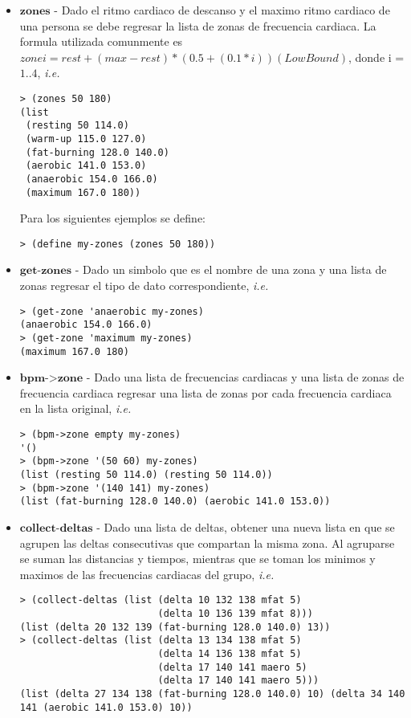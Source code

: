 \documentclass{article}
\begin{document}
\begin{itemize}
\item $\textbf{zones}$ - Dado el ritmo cardiaco de descanso y el maximo ritmo cardiaco de una persona se debe regresar la lista de zonas de frecuencia cardiaca. La formula utilizada comunmente es $zone i = rest + (max - rest) * (0.5 + (0.1*i)) (Low Bound)$, donde i = $1..4$, \textit{i.e.}

\begin{verbatim}
> (zones 50 180)
(list
 (resting 50 114.0)
 (warm-up 115.0 127.0)
 (fat-burning 128.0 140.0)
 (aerobic 141.0 153.0)
 (anaerobic 154.0 166.0)
 (maximum 167.0 180))
\end{verbatim}

Para los siguientes ejemplos se define:
\begin{verbatim}
> (define my-zones (zones 50 180))
\end{verbatim}

\item $\textbf{get-zones}$ - Dado un simbolo que es el nombre de una zona y una lista de zonas regresar el tipo de dato correspondiente, \textit{i.e.}
\begin{verbatim}
> (get-zone 'anaerobic my-zones)
(anaerobic 154.0 166.0)
> (get-zone 'maximum my-zones)
(maximum 167.0 180)
\end{verbatim}

\item $\textbf{bpm->zone}$ - Dado una lista de frecuencias cardiacas y una lista de zonas de frecuencia cardiaca regresar una lista de zonas por cada frecuencia cardiaca en la lista original, \textit{i.e.}
\begin{verbatim}
> (bpm->zone empty my-zones)
'()
> (bpm->zone '(50 60) my-zones) 
(list (resting 50 114.0) (resting 50 114.0))
> (bpm->zone '(140 141) my-zones) 
(list (fat-burning 128.0 140.0) (aerobic 141.0 153.0))
\end{verbatim}

\item $\textbf{collect-deltas}$ - Dado una lista de deltas, obtener una nueva lista en que se agrupen las deltas consecutivas que compartan la misma zona. Al agruparse se suman las distancias y tiempos, mientras que se toman los minimos y maximos de las frecuencias cardiacas del grupo, \textit{i.e.}
\begin{verbatim}
> (collect-deltas (list (delta 10 132 138 mfat 5) 
                        (delta 10 136 139 mfat 8)))
(list (delta 20 132 139 (fat-burning 128.0 140.0) 13))
> (collect-deltas (list (delta 13 134 138 mfat 5) 
                        (delta 14 136 138 mfat 5)
                        (delta 17 140 141 maero 5)
                        (delta 17 140 141 maero 5)))
(list (delta 27 134 138 (fat-burning 128.0 140.0) 10) (delta 34 140 141 (aerobic 141.0 153.0) 10))
\end{verbatim}
\end{itemize}
\end{document}
